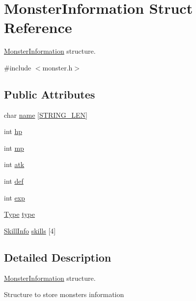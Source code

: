 \hypertarget{structMonsterInformation}{}\section{Monster\+Information Struct Reference}
\label{structMonsterInformation}


\hyperlink{structMonsterInformation}{Monster\+Information} structure.  




{\ttfamily \#include $<$monster.\+h$>$}

\subsection*{Public Attributes}
\begin{DoxyCompactItemize}
\item 
char \hyperlink{structMonsterInformation_a58162820b419113b2bf740cfaa8b2cc3}{name} \mbox{[}\hyperlink{user_8h_ad6d94ce273637446121c9cbd16b6077f}{S\+T\+R\+I\+N\+G\+\_\+\+L\+EN}\mbox{]}
\item 
int \hyperlink{structMonsterInformation_a6ad86f0b185e5e4c4ae021e69ac2ba69}{hp}
\item 
int \hyperlink{structMonsterInformation_a21d696c0d07cf9d8678ebbc8c66e76eb}{mp}
\item 
int \hyperlink{structMonsterInformation_a6ac1dc7a76bb69c22ae27f93360eca91}{atk}
\item 
int \hyperlink{structMonsterInformation_a850523f5ffc9fdb8556385190613c072}{def}
\item 
int \hyperlink{structMonsterInformation_aeab434fcc7f2f388578d972bfc0118cf}{exp}
\item 
\hyperlink{skill_8h_a1d1cfd8ffb84e947f82999c682b666a7}{Type} \hyperlink{structMonsterInformation_abbfcedc38c63f01e7b587de07e00436b}{type}
\item 
\hyperlink{skill_8h_aa7a27dc845bcc95c786a871b170bf850}{Skill\+Info} \hyperlink{structMonsterInformation_a33f81b5e6dd1b3d450ed5aeb3141cdc2}{skills} \mbox{[}4\mbox{]}
\end{DoxyCompactItemize}


\subsection{Detailed Description}
\hyperlink{structMonsterInformation}{Monster\+Information} structure. 

Structure to store monster\textquotesingle{}s information 

